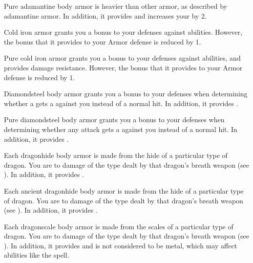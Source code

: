          Pure adamantine body armor is heavier than other armor, as described by adamantine armor.
        In addition, it provides   and increases your  by 2.

         Cold iron armor grants you a  bonus to your defenses against \magical abilities.
        However, the bonus that it provides to your Armor defense is reduced by 1.

         Pure cold iron armor grants you a  bonus to your defenses against \magical abilities, and provides  damage resistance.
        However, the bonus that it provides to your Armor defense is reduced by 1.

         Diamondsteel body armor grants you a  bonus to your defenses when determining whether a  gets a  against you instead of a normal hit.
        In addition, it provides  .

         Pure diamondsteel body armor grants you a  bonus to your defenses when determining whether any attack gets a  against you instead of a normal hit.
        In addition, it provides  .

         Each dragonhide body armor is made from the hide of a particular type of dragon.
        You are  to damage of the type dealt by that dragon's breath weapon (see ).
        In addition, it provides  .

         Each ancient dragonhide body armor is made from the hide of a particular type of dragon.
        You are  to damage of the type dealt by that dragon's breath weapon (see ).
        In addition, it provides  .

         Each dragonscale body armor is made from the scales of a particular type of dragon.
        You are  to damage of the type dealt by that dragon's breath weapon (see ).
        In addition, it provides   and is not considered to be metal, which may affect abilities like the  spell.

